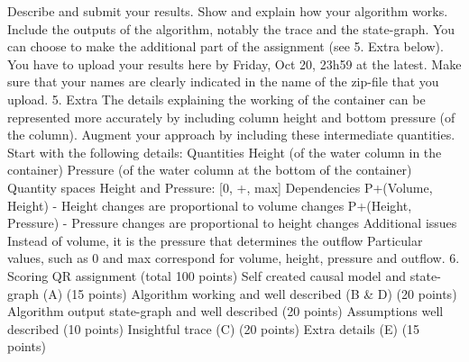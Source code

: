 Describe and submit your results. Show and explain how your algorithm works. Include the outputs of the algorithm, notably the trace and the state-graph.
You can choose to make the additional part of the assignment (see 5. Extra below).
You have to upload your results here by Friday, Oct 20, 23h59 at the latest. Make sure that your names are clearly indicated in the name of the zip-file that you upload.
5. Extra
The details explaining the working of the container can be represented more accurately by including column height and bottom pressure (of the column). Augment your approach by including these intermediate quantities. Start with the following details:
Quantities
Height (of the water column in the container)
Pressure (of the water column at the bottom of the container)
Quantity spaces
Height and Pressure: [0, +, max]
Dependencies
P+(Volume, Height) - Height changes are proportional to volume changes
P+(Height, Pressure) - Pressure changes are proportional to height changes
Additional issues
Instead of volume, it is the pressure that determines the outflow
Particular values, such as 0 and max correspond for volume, height, pressure and outflow.
6. Scoring QR assignment (total 100 points)
Self created causal model and state-graph (A) (15 points)
Algorithm working and well described (B & D) (20 points)
Algorithm output state-graph and well described (20 points)
Assumptions well described (10 points)
Insightful trace (C) (20 points)
Extra details (E) (15 points)
